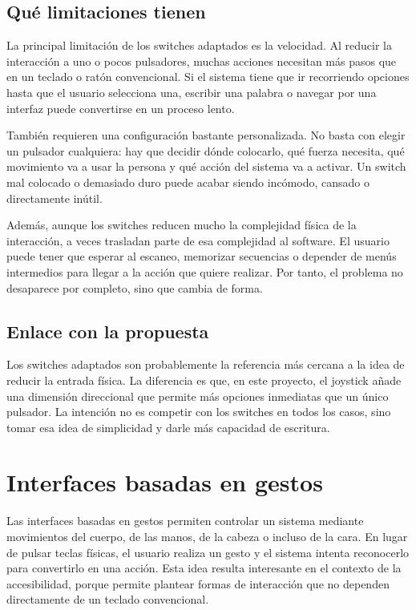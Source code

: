 \subsection{Qué limitaciones tienen}

La principal limitación de los switches adaptados es la velocidad. Al reducir la interacción a uno o pocos pulsadores, muchas acciones necesitan más pasos que en un teclado o ratón convencional. Si el sistema tiene que ir recorriendo opciones hasta que el usuario selecciona una, escribir una palabra o navegar por una interfaz puede convertirse en un proceso lento.

También requieren una configuración bastante personalizada. No basta con elegir un pulsador cualquiera: hay que decidir dónde colocarlo, qué fuerza necesita, qué movimiento va a usar la persona y qué acción del sistema va a activar. Un switch mal colocado o demasiado duro puede acabar siendo incómodo, cansado o directamente inútil.

Además, aunque los switches reducen mucho la complejidad física de la interacción, a veces trasladan parte de esa complejidad al software. El usuario puede tener que esperar al escaneo, memorizar secuencias o depender de menús intermedios para llegar a la acción que quiere realizar. Por tanto, el problema no desaparece por completo, sino que cambia de forma.

\subsection{Enlace con la propuesta}

Los switches adaptados son probablemente la referencia más cercana a la idea de reducir la entrada física. La diferencia es que, en este proyecto, el joystick añade una dimensión direccional que permite más opciones inmediatas que un único pulsador. La intención no es competir con los switches en todos los casos, sino tomar esa idea de simplicidad y darle más capacidad de escritura.



\section{Interfaces basadas en gestos}
\label{sec:interfaces-gestos}

Las interfaces basadas en gestos permiten controlar un sistema mediante movimientos del cuerpo, de las manos, de la cabeza o incluso de la cara. En lugar de pulsar teclas físicas, el usuario realiza un gesto y el sistema intenta reconocerlo para convertirlo en una acción. Esta idea resulta interesante en el contexto de la accesibilidad, porque permite plantear formas de interacción que no dependen directamente de un teclado convencional.

